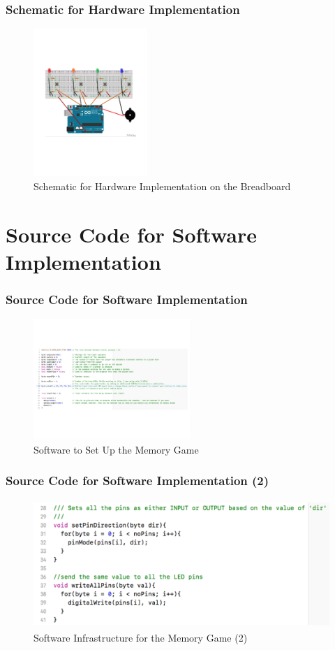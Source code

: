 \documentclass[xcolor={usenames,dvipsnames},hyperref={hyperindex,bookmarks}]{beamer}
\begin{document}
\frame
{
	\frametitle{Schematic for Hardware Implementation}

\begin{figure}[h]
\centering 
\includegraphics[height=2.2in]{./pics/hw-implementation-simple-simon}
\caption{Schematic for Hardware Implementation on the Breadboard}
\label{fig:hwimplementationsimplesimon}
\end{figure}
}


\section{Source Code for Software Implementation}

\frame
{
	\frametitle{Source Code for Software Implementation}

\begin{figure}[h]
\centering 
\includegraphics[height=1.80in]{./pics/sw-setup}
\caption{Software to Set Up the Memory Game}
\label{fig:swsetup}
\end{figure}
}



\frame
{
	\frametitle{Source Code for Software Implementation (2)}

\begin{figure}[h]
\centering 
\includegraphics[height=1.90in]{./pics/sw-infrastructure}
\caption{Software Infrastructure for the Memory Game (2)}
\label{fig:swinfrastructure}
\end{figure}
}
\end{document}
